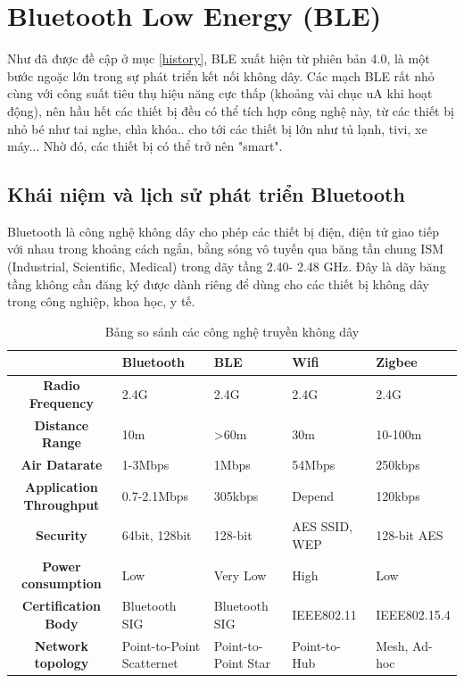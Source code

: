 \section{Bluetooth Low Energy (BLE) }  %
\label{section1.3} %
Như đã được đề cập ở mục \ref{history}, BLE xuất hiện từ phiên bản 4.0, là một bước ngoặc lớn trong sự phát triển kết nối không dây. Các mạch BLE rất nhỏ cùng với công suất tiêu thụ hiệu năng cực thấp (khoảng vài chục uA khi hoạt động), nên hầu hết các thiết bị đều có thể tích hợp công nghệ này, từ các thiết bị nhỏ bé như tai nghe, chìa khóa.. cho tới các thiết bị lớn như tủ lạnh, tivi, xe máy... Nhờ đó, các thiết bị có thể trở nên "smart".

\subsection{Khái niệm và lịch sử phát triển Bluetooth}
Bluetooth là công nghệ không dây cho phép các thiết bị điện, điện tử giao tiếp với nhau trong khoảng cách ngắn, bằng sóng vô tuyến qua băng tần chung ISM (Industrial, Scientific, Medical) trong dãy tầng 2.40- 2.48 GHz. Đây là dãy băng tầng không cần đăng ký được dành riêng để dùng cho các thiết bị không dây trong công nghiệp, khoa học, y tế.

	\begin{table}[ht]
		\begin{tabular}{ |c|m{2cm}|m{2cm}|m{2cm}|m{2cm}| } 
			\hline
			& \textbf{Bluetooth} & \textbf{BLE} & \textbf{Wifi} & \textbf{Zigbee} \\ 
			\hline
			\textbf{Radio Frequency} &	2.4G &	2.4G &	2.4G &	2.4G \\ 
			\hline
			\textbf{Distance Range} &	10m	&>60m &	30m	& 10-100m \\ 
			\hline
			\textbf{Air Datarate} &	1-3Mbps &	1Mbps &	54Mbps &	250kbps \\
			\hline
			\textbf{Application Throughput} &	0.7-2.1Mbps &	305kbps &Depend &120kbps\\
			\hline
			\textbf{Security} &	64bit, 128bit &	128-bit & AES	SSID, WEP&	128-bit AES \\
			\hline
			\textbf{Power consumption}&	Low	&Very Low&	High&	Low \\
			\hline
			\textbf{Certification Body}&	Bluetooth SIG&	Bluetooth SIG&	IEEE802.11&	IEEE802.15.4 \\
			\hline
			\textbf{Network topology} &	Point-to-Point Scatternet&	Point-to-Point Star&	Point-to-Hub& 		Mesh, Ad-hoc\\
			\hline
		\end{tabular}
		\caption {Bảng so sánh các công nghệ truyền không dây}
		\label{table:1.1}
	\end{table}

